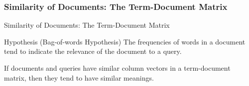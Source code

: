 \subsubsection{Similarity of Documents: The Term-Document Matrix}
\begin{frame}{Similarity of Documents: The Term-Document Matrix}
\begin{block}{Hypothesis (Bag-of-words Hypothesis)}
The frequencies of words in a document tend to indicate the relevance of the document to a query\cite{Salton1975vsmh1}.
\end{block}
If documents and queries have similar column vectors in a term-document matrix, then they tend to have similar meanings.\\
\end{frame}

